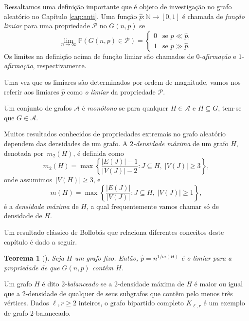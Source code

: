 \documentclass[12pt,a4paper]{book}
\newcommand{\K}{K_{\ell,r}} %
\let\subset\subseteq
\newtheorem{teorema}{Teorema}[chapter]
\def\cP{{\mathcal P}}
\def\cP{{\mathcal P}}
\begin{document}
Ressaltamos uma definição importante que é objeto de investigação no grafo aleatório no Capítulo \ref{cap:anti}.
Uma função $\hat{p}: \mathbb{N} \rightarrow [0,1]$ é chamada de \textit{função limiar} para uma propriedade
$\cP$ no $G(n,p)$ se 
\[
  \lim_{n\to\infty}\mathbb{P}\left(G(n,p) \in \cP\right)
  =
  \begin{cases}0&\text{se }p \ll \hat p, \\
    1&\text{se }p \gg \hat p.
  \end{cases}
\]
Os limites na definição acima de função limiar são chamados de $0$-\emph{afirmação} e $1$-\emph{afirmação}, respectivamente. 

Uma vez que os limiares são determinados por ordem de magnitude, vamos nos referir aos limiares $\hat{p}$ como \emph{o limiar} da propriedade $\cP$.

Um conjunto de grafos $\mathcal{A}$ é \textit{monótono} se para qualquer $H \in \mathcal{A}$ e $H \subseteq G$, tem-se que $G \in \mathcal{A}$. 

Muitos resultados conhecidos de propriedades extremais no grafo aleatório dependem das densidades de um grafo.
A \emph{$2$-densidade máxima} de um grafo $H$, denotada por~$m_2(H)$, é definida como 
\begin{equation*}
  m_2(H)=\max\left\{\frac{|E(J)|-1}{|V(J)|-2}\colon J\subset H,\;|V(J)|\geq3\right\},
\end{equation*}
onde assumimos~$|V(H)|\geq3$, e 
\[
    m(H) = \max\left\{\frac{|E(J)|}{|V(J)|}\colon J\subset H,\;|V(J)|\geq1\right\},
\]
é a \emph{densidade máxima} de $H$, a qual frequentemente vamos chamar só de densidade de $H$.

Um resultado clássico de Bollobás que relaciona diferentes conceitos deste capítulo é dado a seguir.


\begin{teorema}[\cite{bollobas1981threshold}]\label{teo:gnpcontem}
    Seja $H$ um grafo fixo. Então, $\hat{p} = n^{1/m(H)}$ é o limiar para a propriedade de que $G(n,p)$ contém $H$.
\end{teorema}

Um grafo $H$ é dito 2-\textit{balanceado} se a 2-densidade máxima de $H$ é maior ou igual que a 2-densidade de qualquer de seus subgrafos que contêm pelo menos três vértices. 
Dados $\ell,r\geq 2$ inteiros, o grafo bipartido completo $\K$ é um exemplo de grafo 2-balanceado.
\end{document}
